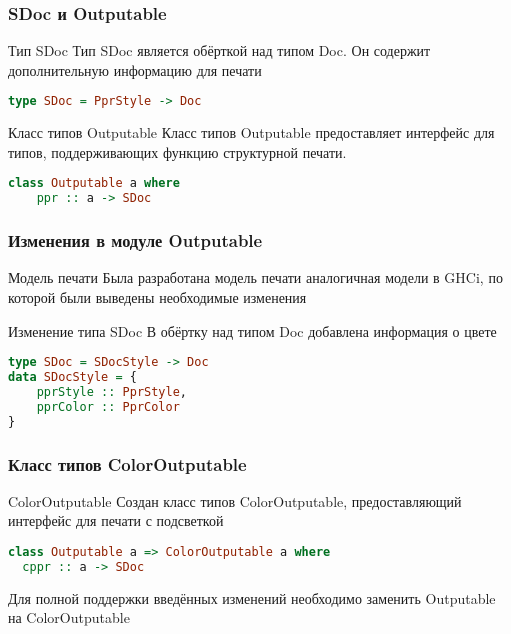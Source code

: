 \documentclass[utf8,russian]{beamer}
\begin{document}
\begin{frame}[fragile]
\frametitle{SDoc и Outputable}

\begin{block}{Тип SDoc}
Тип SDoc является обёрткой над типом Doc. Он содержит дополнительную информацию для печати
\begin{lstlisting}[language=Haskell]
type SDoc = PprStyle -> Doc
\end{lstlisting}
\end{block}

\begin{block}{Класс типов Outputable}
Класс типов Outputable предоставляет интерфейс для типов, поддерживающих функцию структурной печати.
\begin{lstlisting}[language=Haskell]
class Outputable a where
	ppr :: a -> SDoc
\end{lstlisting}
\end{block}

\end{frame}

\begin{frame}[fragile]
\frametitle{Изменения в модуле Outputable}

\begin{block}{Модель печати}
Была разработана модель печати аналогичная модели в GHCi, по которой были выведены необходимые изменения
\end{block}

\begin{block}{Изменение типа SDoc}
В обёртку над типом Doc добавлена информация о цвете
\begin{lstlisting}[language=Haskell]
type SDoc = SDocStyle -> Doc
data SDocStyle = {
    pprStyle :: PprStyle,
    pprColor :: PprColor
}
\end{lstlisting}
\end{block}
\end{frame}

\begin{frame}[fragile]
\frametitle{Класс типов ColorOutputable}

\begin{block}{ColorOutputable}
Создан класс типов ColorOutputable, предоставляющий интерфейс для печати с подсветкой
\begin{lstlisting}[language=Haskell]
class Outputable a => ColorOutputable a where
  cppr :: a -> SDoc
\end{lstlisting}
\end{block}

\begin{block}{}
Для полной поддержки введённых изменений необходимо заменить Outputable на ColorOutputable
\end{block}

\end{frame}
\end{document}
